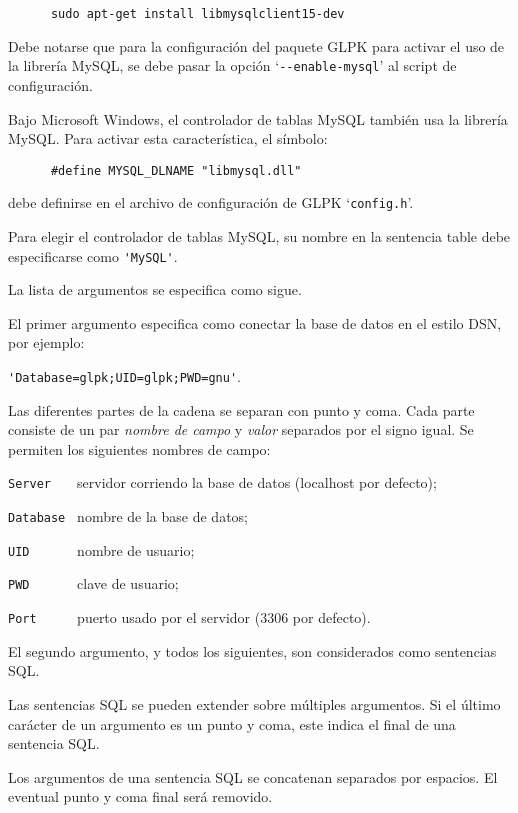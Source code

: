 \documentclass[11pt,spanish]{report}
\def\para#1{\noindent{\bf#1}}
\begin{document}
\begin{verbatim}
      sudo apt-get install libmysqlclient15-dev
\end{verbatim}

Debe notarse que para la configuración del paquete GLPK para activar el uso de la librería MySQL, se debe pasar la opción `\verb|--enable-mysql|' al script de configuración.

\para{Microsoft Windows.}
Bajo Microsoft Windows, el controlador de tablas MySQL también usa la librería MySQL. Para activar esta característica, el símbolo:

\begin{verbatim}
      #define MYSQL_DLNAME "libmysql.dll"
\end{verbatim}

\noindent
debe definirse en el archivo de configuración de GLPK `\verb|config.h|'.

Para elegir el controlador de tablas MySQL, su nombre en la sentencia table debe especificarse como \verb|'MySQL'|.

La lista de argumentos se especifica como sigue.

El primer argumento especifica como conectar la base de datos en el estilo DSN, por ejemplo:

\verb|'Database=glpk;UID=glpk;PWD=gnu'|.

Las diferentes partes de la cadena se separan con punto y coma. Cada parte consiste de un par {\it nombre de campo} y {\it valor} separados por el signo igual. Se permiten los siguientes nombres de campo:

\verb|Server   | servidor corriendo la base de datos (localhost por defecto);

\verb|Database | nombre de la base de datos;

\verb|UID      | nombre de usuario;

\verb|PWD      | clave de usuario;

\verb|Port     | puerto usado por el servidor (3306 por defecto).

El segundo argumento, y todos los siguientes, son considerados como sentencias SQL.

Las sentencias SQL se pueden extender sobre múltiples argumentos. Si el último carácter de un argumento es un punto y coma, este indica el final de una sentencia SQL.

Los argumentos de una sentencia SQL se concatenan separados por espacios. El eventual punto y coma final será removido.
\end{document}
